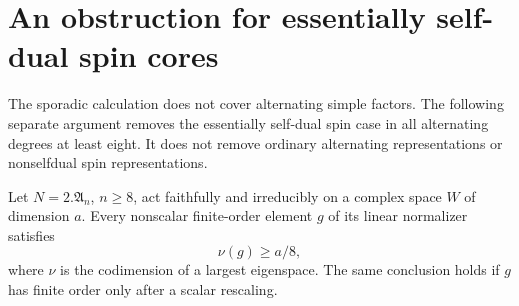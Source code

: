 \section{An obstruction for essentially self-dual spin cores}
\label{sec:spin-core-obstruction}

The sporadic calculation does not cover alternating simple factors.
The following separate argument removes the essentially self-dual
spin case in all alternating degrees at least eight.  It does not
remove ordinary alternating representations or nonselfdual spin
representations.

\begin{lemma}
\label{HD-SPIN-01a}
Let $N=2.\mathfrak A_n$, $n\ge8$, act faithfully and irreducibly
on a complex space $W$ of dimension $a$.  Every nonscalar
finite-order element $g$ of its linear normalizer satisfies
\[
                  \nu(g)\ge a/8,                         \tag{SPIN.1}
\]
where $\nu$ is the codimension of a largest eigenspace.
The same conclusion holds if $g$ has finite order only after a
scalar rescaling.
\end{lemma}

